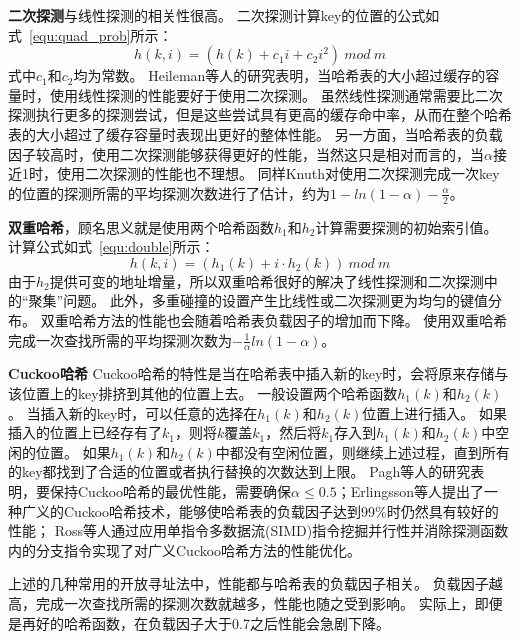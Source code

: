 \textbf{二次探测}与线性探测的相关性很高。
二次探测计算key的位置的公式如式~\ref{equ:quad_prob}所示：
\begin{equation}
h(k,i) = (h(k)+c_1 i+c_2i^2)~{mod}~m
\label{equ:quad_prob}
\end{equation}
式中$c_1$和$c_2$均为常数。
Heileman等人的研究表明，当哈希表的大小超过缓存的容量时，使用线性探测的性能要好于使用二次探测\cite{heileman2005caching}。
虽然线性探测通常需要比二次探测执行更多的探测尝试，但是这些尝试具有更高的缓存命中率，从而在整个哈希表的大小超过了缓存容量时表现出更好的整体性能。
另一方面，当哈希表的负载因子较高时，使用二次探测能够获得更好的性能，当然这只是相对而言的，当$\alpha$接近1时，使用二次探测的性能也不理想\cite{}。
同样Knuth对使用二次探测完成一次key的位置的探测所需的平均探测次数进行了估计，约为$1-ln(1-\alpha)-\frac{\alpha}{2}$。

\textbf{双重哈希}，顾名思义就是使用两个哈希函数$h_1$和$h_2$计算需要探测的初始索引值。
计算公式如式~\ref{equ:double}所示：
\begin{equation}
h(k,i) = (h_1(k)+i\cdot h_2(k)) ~{mod}~m
\label{equ:double}
\end{equation}
由于$h_2$提供可变的地址增量，所以双重哈希很好的解决了线性探测和二次探测中的“聚集”问题。
此外，多重碰撞的设置产生比线性或二次探测更为均匀的键值分布。
双重哈希方法的性能也会随着哈希表负载因子的增加而下降。
使用双重哈希完成一次查找所需的平均探测次数为$-\frac{1}{\alpha}ln(1-\alpha)$。

\textbf{Cuckoo哈希}
Cuckoo哈希的特性是当在哈希表中插入新的key时，会将原来存储与该位置上的key排挤到其他的位置上去。
一般设置两个哈希函数$h_1(k)$和$h_2(k)$。
当插入新的key时，可以任意的选择在$h_1(k)$和$h_2(k)$位置上进行插入。
如果插入的位置上已经存有了$k_1$，则将$k$覆盖$k_1$，然后将$k_1$存入到$h_1(k)$和$h_2(k)$中空闲的位置。
如果$h_1(k)$和$h_2(k)$中都没有空闲位置，则继续上述过程，直到所有的key都找到了合适的位置或者执行替换的次数达到上限\cite{pagh2004cuckoo,erlingsson2006cool}。
Pagh等人的研究表明，要保持Cuckoo哈希的最优性能，需要确保$\alpha\leq 0.5$\cite{pagh2004cuckoo}；Erlingsson等人提出了一种广义的Cuckoo哈希技术\cite{erlingsson2006cool}，能够使哈希表的负载因子达到99\%时仍然具有较好的性能；
Ross等人通过应用单指令多数据流(SIMD)指令挖掘并行性并消除探测函数内的分支指令实现了对广义Cuckoo哈希方法的性能优化\cite{ross2007efficient}。

上述的几种常用的开放寻址法中，性能都与哈希表的负载因子相关。
负载因子越高，完成一次查找所需的探测次数就越多，性能也随之受到影响。
实际上，即便是再好的哈希函数，在负载因子大于0.7之后性能会急剧下降。


